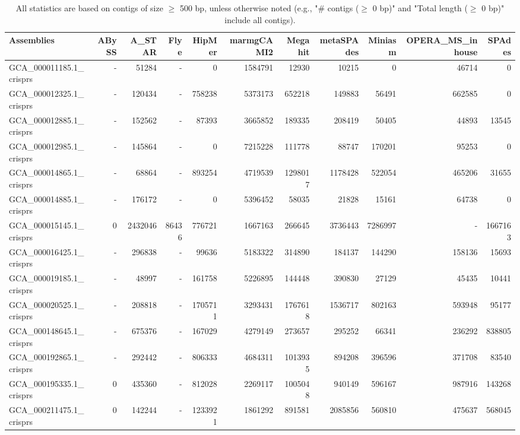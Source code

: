 \documentclass[12pt,a4paper]{article}
\begin{document}
\begin{table}[ht]
\begin{center}
\caption{All statistics are based on contigs of size $\geq$ 500 bp, unless otherwise noted (e.g., "\# contigs ($\geq$ 0 bp)" and "Total length ($\geq$ 0 bp)" include all contigs).}
\begin{tabular}{|l*{10}{|r}|}
\hline
Assemblies & ABySS & A\_STAR & Flye & HipMer & marmgCAMI2 & Megahit & metaSPAdes & Miniasm & OPERA\_MS\_inhouse & SPAdes \\ \hline
GCA\_000011185.1\_crisprs & - & 51284 & - & 0 & 1584791 & 12930 & 10215 & 0 & 46714 & 0 \\ \hline
GCA\_000012325.1\_crisprs & - & 120434 & - & 758238 & 5373173 & 652218 & 149883 & 56491 & 662585 & 0 \\ \hline
GCA\_000012885.1\_crisprs & - & 152562 & - & 87393 & 3665852 & 189335 & 208419 & 50405 & 44893 & 13545 \\ \hline
GCA\_000012985.1\_crisprs & - & 145864 & - & 0 & 7215228 & 111778 & 88747 & 170201 & 95253 & 0 \\ \hline
GCA\_000014865.1\_crisprs & - & 68864 & - & 893254 & 4719539 & 1298017 & 1178428 & 522054 & 465206 & 31655 \\ \hline
GCA\_000014885.1\_crisprs & - & 176172 & - & 0 & 5396452 & 58035 & 21828 & 15161 & 64738 & 0 \\ \hline
GCA\_000015145.1\_crisprs & 0 & 2432046 & 86436 & 776721 & 1667163 & 266645 & 3736443 & 7286997 & - & 1667163 \\ \hline
GCA\_000016425.1\_crisprs & - & 296838 & - & 99636 & 5183322 & 314890 & 184137 & 144290 & 158136 & 15693 \\ \hline
GCA\_000019185.1\_crisprs & - & 48997 & - & 161758 & 5226895 & 144448 & 390830 & 27129 & 45435 & 10441 \\ \hline
GCA\_000020525.1\_crisprs & - & 208818 & - & 1705711 & 3293431 & 1767618 & 1536717 & 802163 & 593948 & 95177 \\ \hline
GCA\_000148645.1\_crisprs & - & 675376 & - & 167029 & 4279149 & 273657 & 295252 & 66341 & 236292 & 838805 \\ \hline
GCA\_000192865.1\_crisprs & - & 292442 & - & 806333 & 4684311 & 1013935 & 894208 & 396596 & 371708 & 83540 \\ \hline
GCA\_000195335.1\_crisprs & 0 & 435360 & - & 812028 & 2269117 & 1005048 & 940149 & 596167 & 987916 & 143268 \\ \hline
GCA\_000211475.1\_crisprs & 0 & 142244 & - & 1233921 & 1861292 & 891581 & 2085856 & 560810 & 475637 & 568045 \\ \hline

\end{tabular}
\end{center}
\end{table}
\end{document}
